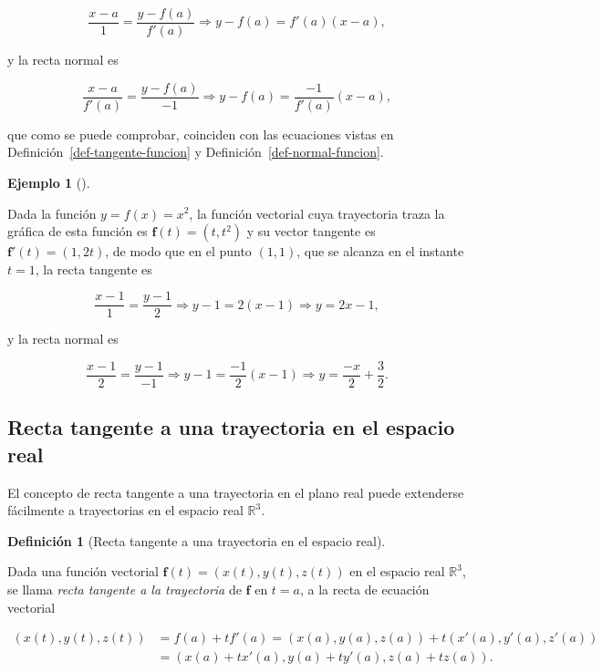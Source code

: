 \documentclass[
  a4paper,
]{scrreport}
\theoremstyle{definition}
\theoremstyle{definition}
\newtheorem{example}{Ejemplo}[chapter]
\theoremstyle{definition}
\newtheorem{definition}{Definición}[chapter]
\theoremstyle{plain}
\theoremstyle{plain}
\theoremstyle{plain}
\theoremstyle{remark}
\begin{document}
\[
\frac{x-a}{1} = \frac{y-f(a)}{f'(a)} \Rightarrow y-f(a) = f'(a)(x-a),
\]

y la recta normal es

\[
\frac{x-a}{f'(a)} = \frac{y-f(a)}{-1} \Rightarrow y-f(a) = \frac{-1}{f'(a)}(x-a),
\]

que como se puede comprobar, coinciden con las ecuaciones vistas en
Definición~\ref{def-tangente-funcion} y
Definición~\ref{def-normal-funcion}.

\begin{example}[]\protect\hypertarget{exm-tangente-normal-funcion}{}\label{exm-tangente-normal-funcion}

Dada la función \(y=f(x)=x^2\), la función vectorial cuya trayectoria
traza la gráfica de esta función es \(\mathbf{f}(t)=(t,t^2)\) y su
vector tangente es \(\mathbf{f}'(t)=(1,2t)\), de modo que en el punto
\((1,1)\), que se alcanza en el instante \(t=1\), la recta tangente es

\[
\frac{x-1}{1} = \frac{y-1}{2} \Rightarrow y-1 = 2(x-1) \Rightarrow y = 2x-1,
\]

y la recta normal es

\[
\frac{x-1}{2} = \frac{y-1}{-1} \Rightarrow y-1 = \frac{-1}{2}(x-1) \Rightarrow y = \frac{-x}{2}+\frac{3}{2}.
\]

\end{example}

\subsection{Recta tangente a una trayectoria en el espacio
real}\label{recta-tangente-a-una-trayectoria-en-el-espacio-real}

El concepto de recta tangente a una trayectoria en el plano real puede
extenderse fácilmente a trayectorias en el espacio real
\(\mathbb{R}^3\).

\begin{definition}[Recta tangente a una trayectoria en el espacio
real]\protect\hypertarget{def-tangente-trayectoria-espacio}{}\label{def-tangente-trayectoria-espacio}

Dada una función vectorial \(\mathbf{f}(t)=(x(t),y(t),z(t))\) en el
espacio real \(\mathbb{R}^3\), se llama \emph{recta tangente a la
trayectoria} de \(\mathbf{f}\) en \(t=a\), a la recta de ecuación
vectorial

\begin{align*}
(x(t), y(t), z(t)) 
&= f(a)+tf'(a) = (x(a), y(a), z(a)) + t(x'(a), y'(a), z'(a)) \\
& = (x(a)+tx'(a), y(a)+ty'(a), z(a)+tz(a)).
\end{align*}

\end{definition}
\end{document}
